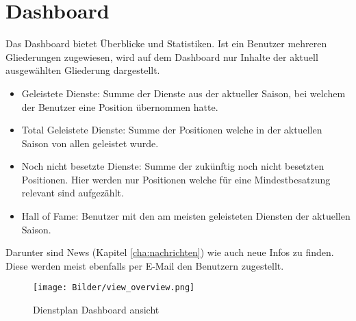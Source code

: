 \chapter{Dashboard}
\label{cha:dashboard}

Das Dashboard bietet Überblicke und Statistiken. Ist ein Benutzer mehreren Gliederungen zugewiesen, wird auf dem Dashboard nur Inhalte der aktuell ausgewählten Gliederung dargestellt.

\begin{itemize}
\item Geleistete Dienste: Summe der Dienste aus der aktueller Saison, bei welchem der Benutzer eine Position übernommen hatte.
\item Total Geleistete Dienste: Summe der Positionen welche in der aktuellen Saison von allen geleistet wurde.
\item Noch nicht besetzte Dienste: Summe der zukünftig noch nicht besetzten Positionen. Hier werden nur Positionen welche für eine Mindestbesatzung relevant sind aufgezählt.
\item Hall of Fame: Benutzer mit den am meisten geleisteten Diensten der aktuellen Saison. 
\end{itemize}

\noindent Darunter sind News (Kapitel \ref{cha:nachrichten}) wie auch neue Infos zu finden. Diese werden meist ebenfalls per E-Mail den Benutzern zugestellt.

\begin{figure}[h]
 \begin{addmargin}{-0.2\linewidth}
   \centering 
   \texttt{[image: Bilder/view\_overview.png]}
 \end{addmargin} 
 \caption[Dashboard ansicht]{Dienstplan Dashboard ansicht}
 \label{fig:view_overview}
\end{figure}